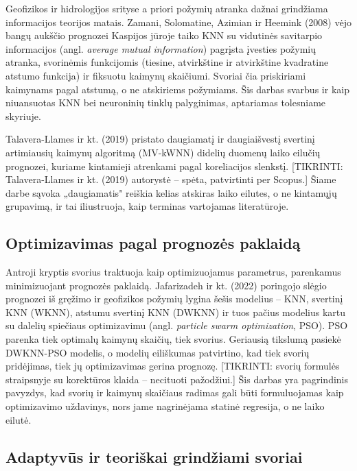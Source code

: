 \documentclass[]{VUMIFTemplateClass}
\begin{document}
    Geofizikos ir hidrologijos srityse a priori požymių atranka dažnai grindžiama informacijos teorijos matais. Zamani, Solomatine, Azimian ir Heemink (2008) vėjo bangų aukščio prognozei Kaspijos jūroje taiko KNN su vidutinės savitarpio informacijos (angl. \textit{average mutual information}) pagrįsta įvesties požymių atranka, svorinėmis funkcijomis (tiesine, atvirkštine ir atvirkštine kvadratine atstumo funkcija) ir fiksuotu kaimynų skaičiumi. Svoriai čia priskiriami kaimynams pagal atstumą, o ne atskiriems požymiams. Šis darbas svarbus ir kaip niuansuotas KNN bei neuroninių tinklų palyginimas, aptariamas tolesniame skyriuje.

    Talavera-Llames ir kt. (2019) pristato daugiamatį ir daugiaišvestį svertinį artimiausių kaimynų algoritmą (MV-kWNN) didelių duomenų laiko eilučių prognozei, kuriame kintamieji atrenkami pagal koreliacijos slenkstį. [TIKRINTI: Talavera-Llames ir kt. (2019) autorystė -- spėta, patvirtinti per Scopus.] Šiame darbe sąvoka „daugiamatis" reiškia kelias atskiras laiko eilutes, o ne kintamųjų grupavimą, ir tai iliustruoja, kaip terminas vartojamas literatūroje.

    \subsection{Optimizavimas pagal prognozės paklaidą}

    Antroji kryptis svorius traktuoja kaip optimizuojamus parametrus, parenkamus minimizuojant prognozės paklaidą. Jafarizadeh ir kt. (2022) poringojo slėgio prognozei iš gręžimo ir geofizikos požymių lygina šešis modelius -- KNN, svertinį KNN (WKNN), atstumu svertinį KNN (DWKNN) ir tuos pačius modelius kartu su dalelių spiečiaus optimizavimu (angl. \textit{particle swarm optimization}, PSO). PSO parenka tiek optimalų kaimynų skaičių, tiek svorius. Geriausią tikslumą pasiekė DWKNN-PSO modelis, o modelių eiliškumas patvirtino, kad tiek svorių pridėjimas, tiek jų optimizavimas gerina prognozę. [TIKRINTI: svorių formulės straipsnyje su korektūros klaida -- necituoti pažodžiui.] Šis darbas yra pagrindinis pavyzdys, kad svorių ir kaimynų skaičiaus radimas gali būti formuluojamas kaip optimizavimo uždavinys, nors jame nagrinėjama statinė regresija, o ne laiko eilutė.

    \subsection{Adaptyvūs ir teoriškai grindžiami svoriai}
\end{document}
